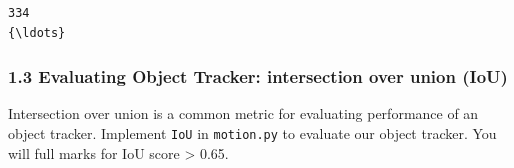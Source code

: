 \documentclass[11pt]{article}
\begin{document}
    \begin{Verbatim}[commandchars=\\\{\}]
334
{\ldots}
    \end{Verbatim}

    \hypertarget{evaluating-object-tracker-intersection-over-union-iou}{%
\subsubsection{1.3 Evaluating Object Tracker: intersection over union
(IoU)}\label{evaluating-object-tracker-intersection-over-union-iou}}

Intersection over union is a common metric for evaluating performance of
an object tracker. Implement \texttt{IoU} in \texttt{motion.py} to
evaluate our object tracker. You will full marks for IoU score
\textgreater{} 0.65.
\end{document}
